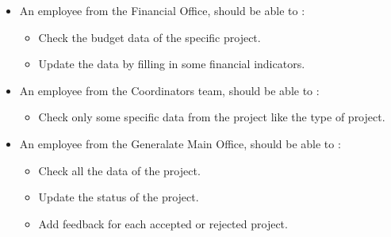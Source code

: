 \begin{itemize}
\item An employee from the Financial Office, should be able to :
\begin{itemize}
    \item Check the budget data of the specific project.
    \item Update the data by filling in some financial indicators. 
\end{itemize}
\item An employee from the Coordinators team, should be able to :
\begin{itemize}
    \item Check only some specific data from the project like the type of project.
\end{itemize}
\item An employee from the Generalate Main Office, should be able to :
\begin{itemize}
    \item Check all the data of the project. 
    \item Update the status of the project. 
    \item Add feedback for each accepted or rejected project.
\end{itemize}
\end{itemize}
  

